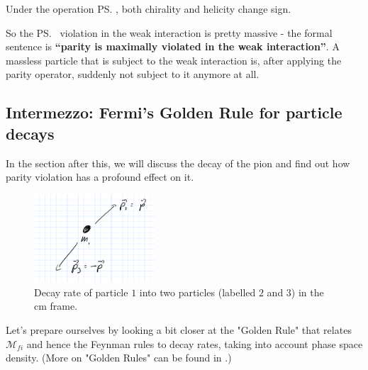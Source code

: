  Under the operation \ps, both chirality and helicity change sign.

 So the \ps\ violation in the weak interaction is pretty massive - the
 formal sentence is \textbf{``parity is maximally violated in the weak
 interaction''}. A massless particle that is subject to the weak interaction is, after
 applying the parity operator, suddenly not subject to it anymore at
 all.

\subsection{Intermezzo: Fermi's Golden Rule for particle decays}
In the section after this, we will discuss the decay of the pion and find out how parity violation has a profound effect on it. 
\begin{figure}
\centering
\includegraphics[width=0.4\textwidth]{fig/weak/Decay122}
\caption{Decay rate of particle $1$ into two particles (labelled $2$ and $3$) in the cm frame.\label{fig:Decay122}}
\end{figure}
Let's prepare ourselves by looking a bit closer at the "Golden Rule" that relates $\mathcal{M}_{fi}$ and hence the Feynman rules to decay rates, taking into account phase space density. (More on "Golden Rules" can be found in .)
